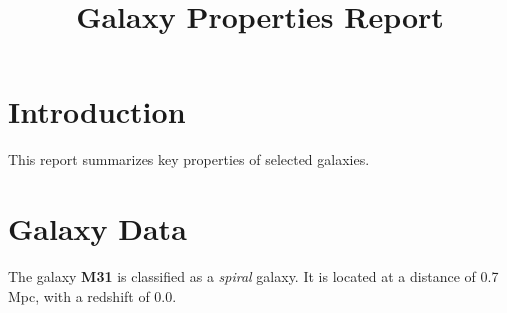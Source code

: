 \documentclass{article}
\title{Galaxy Properties Report}
\author{}
\date{}
\begin{document}
\maketitle

\section{Introduction}
This report summarizes key properties of selected galaxies.

\section{Galaxy Data}
The galaxy \textbf{M31} is classified as a \textit{spiral} galaxy. 
It is located at a distance of 0.7 Mpc, with a redshift of 0.0.
\end{document}
